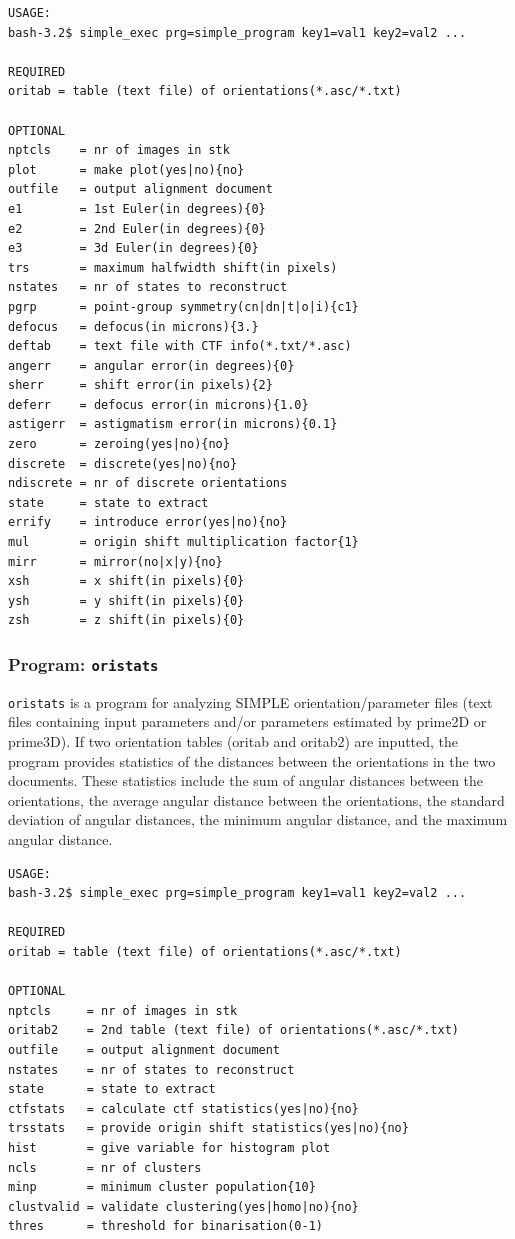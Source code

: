 \documentclass[a4paper,11pt]{article}
\newcommand{\prgname}[1]{\textcolor{NavyBlue}{\texttt{#1}}}
\begin{document}
\begin{verbatim}
USAGE:
bash-3.2$ simple_exec prg=simple_program key1=val1 key2=val2 ...

REQUIRED
oritab = table (text file) of orientations(*.asc/*.txt)

OPTIONAL
nptcls    = nr of images in stk
plot      = make plot(yes|no){no}
outfile   = output alignment document
e1        = 1st Euler(in degrees){0}
e2        = 2nd Euler(in degrees){0}
e3        = 3d Euler(in degrees){0}
trs       = maximum halfwidth shift(in pixels)
nstates   = nr of states to reconstruct
pgrp      = point-group symmetry(cn|dn|t|o|i){c1}
defocus   = defocus(in microns){3.}
deftab    = text file with CTF info(*.txt/*.asc)
angerr    = angular error(in degrees){0}
sherr     = shift error(in pixels){2}
deferr    = defocus error(in microns){1.0}
astigerr  = astigmatism error(in microns){0.1}
zero      = zeroing(yes|no){no}
discrete  = discrete(yes|no){no}
ndiscrete = nr of discrete orientations
state     = state to extract
errify    = introduce error(yes|no){no}
mul       = origin shift multiplication factor{1}
mirr      = mirror(no|x|y){no}
xsh       = x shift(in pixels){0}
ysh       = y shift(in pixels){0}
zsh       = z shift(in pixels){0}
\end{verbatim}

\subsubsection{Program: \prgname{oristats}}
\label{oristats}
\prgname{oristats} is a program for analyzing SIMPLE orientation/parameter files (text files containing input parameters and/or parameters estimated by prime2D or prime3D). If two orientation tables (oritab and oritab2) are inputted, the program provides statistics of the distances between the orientations in the two documents. These statistics include the sum of angular distances between the orientations, the average angular distance between the orientations, the standard deviation of angular distances, the minimum angular distance, and the maximum angular distance.

\begin{verbatim}
USAGE:
bash-3.2$ simple_exec prg=simple_program key1=val1 key2=val2 ...

REQUIRED
oritab = table (text file) of orientations(*.asc/*.txt)

OPTIONAL
nptcls     = nr of images in stk
oritab2    = 2nd table (text file) of orientations(*.asc/*.txt)
outfile    = output alignment document
nstates    = nr of states to reconstruct
state      = state to extract
ctfstats   = calculate ctf statistics(yes|no){no}
trsstats   = provide origin shift statistics(yes|no){no}
hist       = give variable for histogram plot
ncls       = nr of clusters
minp       = minimum cluster population{10}
clustvalid = validate clustering(yes|homo|no){no}
thres      = threshold for binarisation(0-1)
\end{verbatim}
\end{document}
